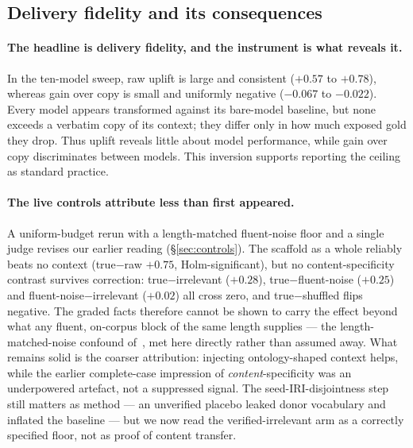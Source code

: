 \documentclass[10pt,twocolumn]{article}
\begin{document}
\subsection{Delivery fidelity and its consequences}
\paragraph{The headline is delivery fidelity, and the instrument is what reveals it.} In the ten-model sweep, raw uplift is large and consistent ($+0.57$ to $+0.78$), whereas gain over copy is small and uniformly negative ($-0.067$ to $-0.022$). Every model appears transformed against its bare-model baseline, but none exceeds a verbatim copy of its context; they differ only in how much exposed gold they drop. Thus uplift reveals little about model performance, while gain over copy discriminates between models. This inversion supports reporting the ceiling as standard practice.

\paragraph{The live controls attribute less than first appeared.} A uniform-budget rerun with a length-matched fluent-noise floor and a single judge revises our earlier reading (\S\ref{sec:controls}). The scaffold as a whole reliably beats no context (true$-$raw $+0.75$, Holm-significant), but no content-specificity contrast survives correction: true$-$irrelevant ($+0.28$), true$-$fluent-noise ($+0.25$) and fluent-noise$-$irrelevant ($+0.02$) all cross zero, and true$-$shuffled flips negative. The graded facts therefore cannot be shown to carry the effect beyond what any fluent, on-corpus block of the same length supplies --- the length-matched-noise confound of~\textcite{cuconasu2024poweofnoise}, met here directly rather than assumed away. What remains solid is the coarser attribution: injecting ontology-shaped context helps, while the earlier complete-case impression of \emph{content}-specificity was an underpowered artefact, not a suppressed signal. The seed-IRI-disjointness step still matters as method --- an unverified placebo leaked donor vocabulary and inflated the baseline --- but we now read the verified-irrelevant arm as a correctly specified floor, not as proof of content transfer.
\end{document}
